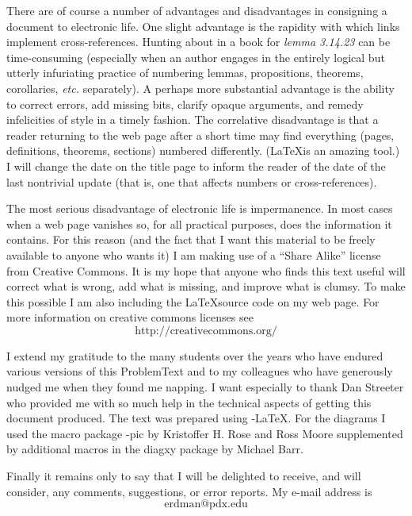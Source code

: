 There are of course a number of advantages and disadvantages in consigning a document to
electronic life. One slight advantage is the rapidity with which links implement
cross-references.  Hunting about in a book for \emph{lemma 3.14.23} can be time-consuming
(especially when an author engages in the entirely logical but utterly infuriating
practice of numbering lemmas, propositions, theorems, corollaries, \emph{etc.}
separately).  A perhaps more substantial advantage is the ability to correct errors, add
missing bits, clarify opaque arguments, and remedy infelicities of style in a timely
fashion.  The correlative disadvantage is that a reader returning to the web page after a
short time may find everything (pages, definitions, theorems, sections) numbered
differently.  (\LaTeX is an amazing tool.) I will change the date on the title page to
inform the reader of the date of the last nontrivial update (that is, one that affects
numbers or cross-references).

The most serious disadvantage of electronic life is impermanence.  In most cases when a
web page vanishes so, for all practical purposes, does the information it contains.  For
this reason (and the fact that I want this material to be freely available to anyone who
wants it) I am making use of a ``Share Alike'' license from Creative Commons. It is my
hope that anyone who finds this text useful will correct what is wrong, add what is
missing, and improve what is clumsy.  To make this possible I am also including the
\LaTeX source code on my web page. For more information on creative commons licenses see
   \[ \text{http://creativecommons.org/} \]

I extend my gratitude to the many students over the years who have endured various
versions of this ProblemText and to my colleagues who have generously nudged me when they
found me napping.  I want especially to thank Dan Streeter who provided me with so much
help in the technical aspects of getting this document produced.  The text was prepared
using \AmS-\LaTeX. For the diagrams I used the macro package \Xy-pic by Kristoffer H.
Rose and Ross Moore supplemented by additional macros in the diagxy package by Michael
Barr.

Finally it remains only to say that I will be delighted to receive, and will consider,
any comments, suggestions, or error reports. My e-mail address is
  \[  \text{erdman@pdx.edu} \]
